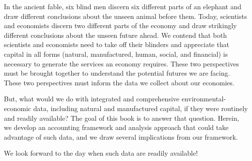 In the ancient fable, 
six blind men discern six different parts 
of an elephant and draw different conclusions 
about the unseen animal before them.
Today, 
scientists and economists discern two different parts 
of the economy and draw strikingly different conclusions 
about the unseen future ahead. 
We contend that both scientists and economists 
need to take off their blinders and 
appreciate that capital in all forms 
(natural, manufactured, human, social, and financial)
is necessary to generate the services an economy requires. 
These two perspectives must be brought together 
to understand the potential futures we are facing. 
These two perspectives must inform the data we collect about our economies.

But, what would we do with integrated and comprehensive environmental-economic data, 
including natural and manufactured capital, 
if they were routinely and readily available? 
The goal of this book is to answer that question.
Herein, we develop an accounting framework 
and analysis approach that could take advantage of such data,
and we draw several implications from our framework.

We look forward to the day when such data are readily available!







%
%

